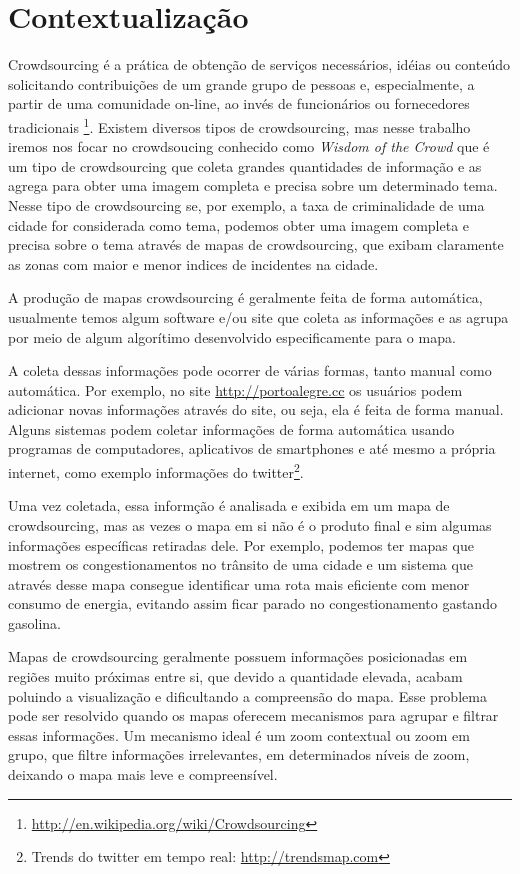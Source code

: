 \section{Contextualização}
Crowdsourcing é a prática de obtenção de serviços necessários, idéias ou conteúdo solicitando contribuições de um grande grupo de pessoas e, especialmente, a partir de uma comunidade on-line, ao invés de funcionários ou fornecedores tradicionais \footnote{\label{wiki-crowd} \url{http://en.wikipedia.org/wiki/Crowdsourcing}}.
Existem diversos tipos de crowdsourcing, mas nesse trabalho iremos nos focar no crowdsoucing conhecido como \emph{Wisdom of the Crowd} que é um tipo de crowdsourcing que coleta grandes quantidades de informação e as agrega para obter uma imagem completa e precisa sobre um determinado tema. Nesse tipo de crowdsourcing se, por exemplo, a taxa de criminalidade de uma cidade for considerada como tema, podemos obter uma imagem completa e precisa sobre o tema através de mapas de crowdsourcing, que exibam claramente as zonas com maior e menor indices de incidentes na cidade.

A produção de mapas crowdsourcing é geralmente feita de forma automática, usualmente temos algum software e/ou site que coleta as informações e as agrupa por meio de algum algorítimo desenvolvido especificamente para o mapa.

A coleta dessas informações pode ocorrer de várias formas, tanto manual como automática. Por exemplo, no site \url{http://portoalegre.cc} os usuários podem adicionar novas informações através do site, ou seja, ela é feita de forma manual. Alguns sistemas podem coletar informações de forma automática usando programas de computadores, aplicativos de smartphones \cite{thiagarajan_cooperative_2010}  e até mesmo a própria internet, como exemplo informações do twitter\footnote{Trends do twitter em tempo real: \url{http://trendsmap.com}}.

Uma vez coletada, essa informção é analisada e exibida em um mapa de crowdsourcing, mas as vezes o mapa em si não é o produto final e sim algumas informações específicas retiradas dele. Por exemplo, podemos ter mapas que mostrem os congestionamentos no trânsito de uma cidade e um sistema \cite{thiagarajan_vtrack:_2009} que através desse mapa consegue identificar  uma rota mais eficiente com menor consumo de energia, evitando assim ficar parado no congestionamento gastando gasolina.

Mapas de crowdsourcing geralmente possuem informações posicionadas em regiões muito próximas entre si, que devido a quantidade elevada, acabam poluindo a visualização e dificultando a compreensão do mapa. Esse problema pode ser resolvido quando os mapas oferecem mecanismos para agrupar e filtrar essas informações. Um mecanismo ideal é um zoom contextual ou zoom em grupo, que filtre informações irrelevantes, em determinados níveis de zoom, deixando o mapa mais leve e compreensível.

